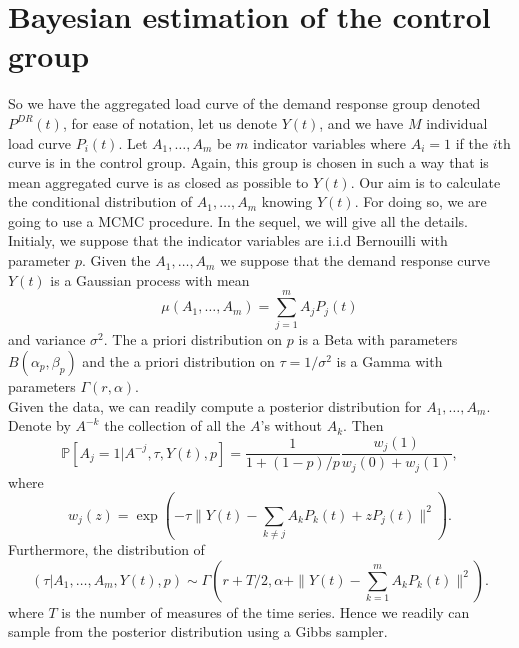\documentclass[journal]{IEEEtran}
\begin{document}
\section{Bayesian estimation of the control group}
So we have the aggregated load curve of the demand response group
denoted $P^{DR}(t)$, for ease of notation, let us denote $Y(t)$, and
we have $M$ individual load curve $P_i(t)$. Let $A_1,\ldots,A_m$ be $m$
indicator variables where $A_i=1$ if the $i$th curve is in the control
group. Again, this group is chosen in such a way that is mean aggregated
curve is as closed as possible to $Y(t)$. Our aim is to calculate the
conditional distribution of $A_1,\ldots,A_m$ knowing $Y(t)$. For doing
so, we are going to use a MCMC procedure. In the sequel, we will give
all the details.\\
Initialy, we suppose that the indicator variables are i.i.d Bernouilli
with parameter $p$. Given the $A_1,\ldots,A_m$ we suppose that the
demand response curve $Y(t)$ is a Gaussian process with mean
\begin{equation}
\mu(A_1,\ldots,A_m) = \sum_{j=1}^m A_j P_j(t)
\end{equation}
and variance $\sigma^2$.
The a priori distribution on $p$ is a Beta with parameters $B(\alpha_p,\beta_p)$
and the a priori distribution on $\tau = 1/\sigma^2$ is a Gamma with
parameters $\Gamma(r,\alpha)$.\\
Given the data, we can readily compute a posterior distribution for 
$A_1,\ldots,A_m$.  Denote by $A^{-k}$ the collection of all the $A$'s
without $A_k$.  Then
\begin{equation}
  {\mathbb P}[A_j = 1 | A^{-j},\tau,Y(t),p] =
  \frac{1}{1+(1-p)/p}\frac{w_j(1)}{w_j(0)+w_j(1)}, \label{curve}
\end{equation}
where 
\begin{equation}
w_j(z) = \exp(-\tau \|Y(t) - \sum_{k \not = j} A_k P_k(t) + z P_j(t)\|^2 ).
\end{equation}
Furthermore, the distribution of 
\begin{equation}
(\tau | A_1,\ldots,A_m, Y(t), p)  \sim \Gamma(r+T/2,\alpha + \|Y(t) - \sum_{k=1}^m A_k P_k(t)\|^2).
\end{equation}
where $T$ is the number of measures of the time series.
Hence we readily can sample from the posterior distribution using a Gibbs sampler.

\medskip
\end{document}
